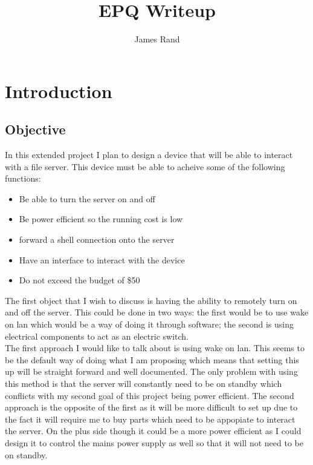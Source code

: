 \documentclass{article}
\title{EPQ Writeup}
\date{}
\author{James Rand}
\begin{document}
\maketitle

\tableofcontents
\setcounter{tocdepth}{5}

\newpage

\section{Introduction}
\subsection{Objective}

In this extended project I plan to design a device that will be able to interact with a file
server. This device must be able to acheive some of the following functions:

\begin{itemize}
    \item Be able to turn the server on and off
    \item Be power efficient so the running cost is low
    \item forward a shell connection onto the server
    \item Have an interface to interact with the device
    \item Do not exceed the budget of \$50
\end{itemize}

The first object that I wish to discuss is having the ability to remotely turn on and off the
server. This could be done in two ways: the first would be to use wake on lan which would be
a way of doing it through software; the second is using electrical components to act as an
electric switch. \\

The first approach I would like to talk about is using wake on lan. This seems to be the default
way of doing what I am proposing which means that setting this up will be straight forward and
well documented. The only problem with using this method is that the server will constantly need
to be on standby which conflicts with my second goal of this project being power efficient. The
second approach is the opposite of the first as it will be more difficult to set up due to the
fact it will require me to buy parts which need to be appopiate to interact the server. On the
plus side though it could be a more power efficient as I could design it to control the mains
power supply as well so that it will not need to be on standby.
\end{document}
